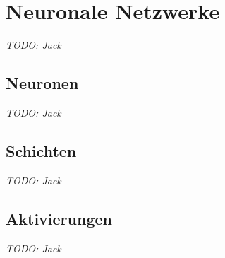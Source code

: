 \chapter{Neuronale Netzwerke}
\emph{TODO: Jack}

\section{Neuronen}
\emph{TODO: Jack}

\section{Schichten}
\emph{TODO: Jack}

\section{Aktivierungen}
\emph{TODO: Jack}